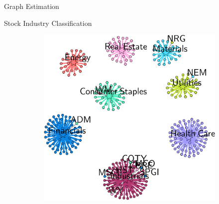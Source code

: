 \documentclass[aspectratio=169]{beamer}
\begin{document}
\begin{frame}{Graph Estimation}
\end{frame}

\begin{frame}{Stock Industry Classification}
  \pause
  \vspace{.75cm}
  \begin{figure}[!htb]
  \captionsetup[subfigure]{justification=centering}
  \centering
  \begin{subfigure}[t]{0.99\textwidth}
      \centering
      \includegraphics[scale=0.38]{figures/bipartite-heavy-tail-kcomp-labels-crop.pdf}
  \end{subfigure}%
 \end{figure}
\end{frame}
\end{document}
